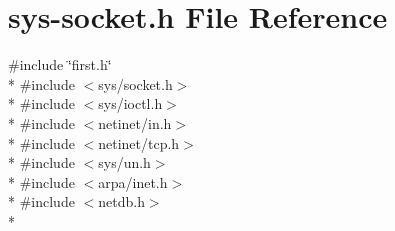\hypertarget{sys-socket_8h}{\section{sys-\/socket.h File Reference}
\label{sys-socket_8h}
}
{\ttfamily \#include \char`\"{}first.\-h\char`\"{}}\\*
{\ttfamily \#include $<$sys/socket.\-h$>$}\\*
{\ttfamily \#include $<$sys/ioctl.\-h$>$}\\*
{\ttfamily \#include $<$netinet/in.\-h$>$}\\*
{\ttfamily \#include $<$netinet/tcp.\-h$>$}\\*
{\ttfamily \#include $<$sys/un.\-h$>$}\\*
{\ttfamily \#include $<$arpa/inet.\-h$>$}\\*
{\ttfamily \#include $<$netdb.\-h$>$}\\*

